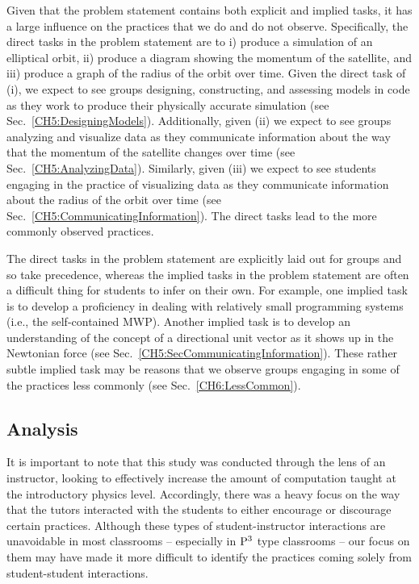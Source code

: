 \documentclass{msuphddissertation}
\begin{document}
\begin{doublespace}
Given that the problem statement contains both explicit and implied tasks, it has a large influence on the practices that we do and do not observe.  Specifically, the direct tasks in the problem statement are to i) produce a simulation of an elliptical orbit, ii) produce a diagram showing the momentum of the satellite, and iii) produce a graph of the radius of the orbit over time.  Given the direct task of (i), we expect to see groups designing, constructing, and assessing models in code as they work to produce their physically accurate simulation (see Sec.~\ref{CH5:DesigningModels}).  Additionally, given (ii) we expect to see groups analyzing and visualize data as they communicate information about the way that the momentum of the satellite changes over time (see Sec.~\ref{CH5:AnalyzingData}).  Similarly, given (iii) we expect to see students engaging in the practice of visualizing data as they communicate information about the radius of the orbit over time (see Sec.~\ref{CH5:CommunicatingInformation}).  The direct tasks lead to the more commonly observed practices.

The direct tasks in the problem statement are explicitly laid out for groups and so take precedence, whereas the implied tasks in the problem statement are often a difficult thing for students to infer on their own.  For example, one implied task is to develop a proficiency in dealing with relatively small programming systems (i.e., the self-contained MWP).  Another implied task is to develop an understanding of the concept of a directional unit vector as it shows up in the Newtonian force (see Sec.~\ref{CH5:SecCommunicatingInformation}).  These rather subtle implied task may be reasons that we observe groups engaging in some of the practices less commonly (see Sec.~\ref{CH6:LessCommon}).

\subsection{Analysis}\label{CH6:Analysis}

It is important to note that this study was conducted through the lens of an instructor, looking to effectively increase the amount of computation taught at the introductory physics level.  Accordingly, there was a heavy focus on the way that the tutors interacted with the students to either encourage or discourage certain practices.  Although these types of student-instructor interactions are unavoidable in most classrooms -- especially in ${\rm P}^{3}$ type classrooms -- our focus on them may have made it more difficult to identify the practices coming solely from student-student interactions.


\end{doublespace}
\end{document}
